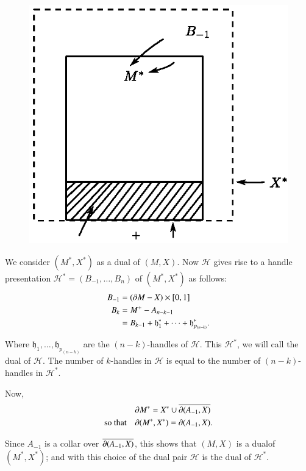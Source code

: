 \begin{figure}[H]
\centering
\includegraphics{figure/fig28.eps}
\end{figure}\pageoriginale 

We consider $(M^{*},X^{*})$ as a dual of $(M,X)$. Now $\mathscr{H}$ gives rise to a handle presentation $\mathscr{H}^{*}=(B_{-1},\ldots,B_{n})$ of $(M^{*},X^{*})$ as follows:
\begin{align*}
B_{-1} &= (\partial M-X)\times [0,1]\\
B_{k} &= M^{+}-A_{n-k-1}\\
&= B_{k-1}+\mathfrak{h}^{*}_{1}+\cdots+\mathfrak{h}^{*}_{p_{(n-k)}}.
\end{align*}

Where $\mathfrak{h}_{1},\ldots,\mathfrak{h}_{p_{(n-k)}}$ are the $(n-k)$-handles of $\mathscr{H}$. This $\mathscr{H}^{*}$, we will call the dual of $\mathscr{H}$. The number of $k$-handles in $\mathscr{H}$ is equal to the number of $(n-k)$-handles in $\mathscr{H}^{*}$.

Now,
\begin{align*}
& \partial M^{*} = X^{*}\cup \overline{\partial (A_{-1},X)}\\
\text{so that}\quad & \partial (M^{*},X^{*})=\partial (A_{-1},X).
\end{align*}

Since $A_{-1}$ is a collar over $\overline{\partial(A_{-1},X)}$, this shows that $(M,X)$ is a dual\pageoriginale of $(M^{*},X^{*})$; and with this choice of the dual pair $\mathscr{H}$ is the dual of $\mathscr{H}^{*}$.


